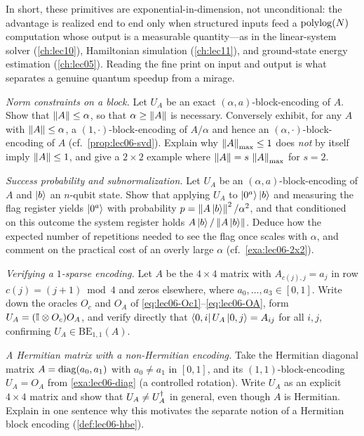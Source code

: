 In short, these primitives are exponential-in-dimension, not unconditional: the
advantage is realized end to end only when structured inputs feed a $\operatorname{polylog}(N)$
computation whose output is a measurable quantity---as in the linear-system solver
(\cref{ch:lec10}), Hamiltonian simulation (\cref{ch:lec11}), and ground-state
energy estimation (\cref{ch:lec05}). Reading the fine print on input and output is
what separates a genuine quantum speedup from a mirage.

\exercisesection
\begin{exercise}\label{ex:lec06-1}
\emph{Norm constraints on a block.} Let $U_A$ be an exact $(\alpha,a)$-block-encoding
of $A$. Show that $\left\lVert A \right\rVert\le\alpha$, so that $\alpha\ge\left\lVert A \right\rVert$ is necessary.
Conversely exhibit, for any $A$ with $\left\lVert A \right\rVert\le\alpha$, a $(1,\cdot)$-block-encoding
of $A/\alpha$ and hence an $(\alpha,\cdot)$-block-encoding of $A$
(cf.\ \cref{prop:lec06-svd}). Explain why $\left\lVert A \right\rVert_{\max}\le1$ does \emph{not} by
itself imply $\left\lVert A \right\rVert\le1$, and give a $2\times2$ example where
$\left\lVert A \right\rVert=s\,\left\lVert A \right\rVert_{\max}$ for $s=2$.
\end{exercise}

\begin{exercise}\label{ex:lec06-2}
\emph{Success probability and subnormalization.} Let $U_A$ be an
$(\alpha,a)$-block-encoding of $A$ and $\ket{b}$ an $n$-qubit state. Show that
applying $U_A$ to $\ket{0^a}\ket{b}$ and measuring the flag register yields $\ket{0^a}$
with probability $p=\left\lVert A\ket{b} \right\rVert^2/\alpha^2$, and that conditioned on this outcome
the system register holds $A\ket{b}/\left\lVert A\ket{b} \right\rVert$. Deduce how the expected number
of repetitions needed to see the flag once scales with $\alpha$, and comment on the
practical cost of an overly large $\alpha$ (cf.\ \cref{exa:lec06-2x2}).
\end{exercise}

\begin{exercise}\label{ex:lec06-3}
\emph{Verifying a $1$-sparse encoding.} Let $A$ be the $4\times4$ matrix with
$A_{c(j),j}=a_j$ in row $c(j)=(j+1)\bmod4$ and zeros elsewhere, where
$a_0,\dots,a_3\in[0,1]$. Write down the oracles $O_c$ and $O_A$ of
\eqref{eq:lec06-Oc1}--\eqref{eq:lec06-OA}, form $U_A=(\mathbb{I}\otimes O_c)O_A$, and verify
directly that $\bra{0,i}U_A\ket{0,j}=A_{ij}$ for all $i,j$, confirming
$U_A\in\mathrm{BE}_{1,1}(A)$.
\end{exercise}

\begin{exercise}\label{ex:lec06-4}
\emph{A Hermitian matrix with a non-Hermitian encoding.} Take the Hermitian diagonal
matrix $A=\operatorname{diag}(a_0,a_1)$ with $a_0\neq a_1$ in $[0,1]$, and its $(1,1)$-block-encoding
$U_A=O_A$ from \cref{exa:lec06-diag} (a controlled rotation). Write $U_A$ as an
explicit $4\times4$ matrix and show that $U_A\neq U_A^{\dagger}$ in general, even though $A$
is Hermitian. Explain in one sentence why this motivates the separate notion of a
Hermitian block encoding (\cref{def:lec06-hbe}).
\end{exercise}

